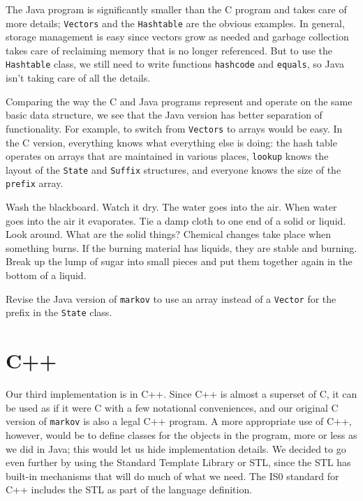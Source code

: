 The Java program is significantly smaller than the C program and takes care
of more details; \verb'Vectors' and the \verb'Hashtable' are the obvious
examples. In general, storage management is easy since vectors grow as
needed and garbage collection takes care of reclaiming memory that is no
longer referenced. But to use the \verb'Hashtable' class, we still need to
write functions \verb'hashcode' and \verb'equals', so Java isn't taking
care of all the details.

Comparing the way the C and Java programs represent and operate on the same
basic data structure, we see that the Java version has better separation of
functionality.  For example, to switch from \verb'Vectors' to arrays would
be easy. In the C version, everything knows what everything else is doing:
the hash table operates on arrays that are maintained in various places,
\verb'lookup' knows the layout of the \verb'State' and \verb'Suffix'
structures, and everyone knows the size of the \verb'prefix' array.
\begin{wellcode}
    Wash the blackboard. Watch it dry. The water goes
    into the air. When water goes into the air it
    evaporates. Tie a damp cloth to one end of a solid or
    liquid. Look around. What are the solid things?
    Chemical changes take place when something burns. If
    the burning material has liquids, they are stable and
    burning. Break up the lump of sugar into small pieces
    and put them together again in the bottom of a liquid.
\end{wellcode}

\begin{wellcode}
    Revise the Java version of \verb'markov' to use an array instead of a
    \verb'Vector' for the prefix in the \verb'State' class.
\end{wellcode}

\section{C++}
\label{sec:c++}

Our third implementation is in C++. Since C++ is almost a superset of C, it
can be used as if it were C with a few notational conveniences, and our
original C version of \verb'markov' is also a legal C++ program. A more
appropriate use of C++, however, would be to define classes for the objects
in the program, more or less as we did in Java; this would let us hide
implementation details. We decided to go even further by using the Standard
Template Library or STL, since the STL has built-in mechanisms that will do
much of what we need. The IS0 standard for C++ includes the STL as part of
the language definition.

